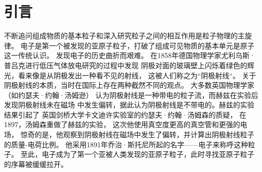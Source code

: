 ﻿\chapter{引言}%
\label{cha:intro}
不断追问组成物质的基本粒子和深入研究粒子之间的相互作用是粒子物理的主旋律。
电子是第一个被发现的亚原子粒子，打破了组成可见物质的基本单元是原子这一传统认识。
发现电子的历史曲折而艰难。
在1858年德国物理学家尤利乌斯·普吕克进行低压气体放电研究的过程中发现
阴极对面的玻璃壁上闪烁着绿色的辉光，看来像是从阴极发出一种看不见的射线，
这被人们称之为``阴极射线``\cite{Segr1981From}。
关于阴极射线的本质，当时在国际上存在两种截然不同的观点。
大多数英国物理学家（如约瑟夫·约翰·汤姆逊）
认为阴极射线是一种带电的粒子流，而赫兹在实验后发现阴极射线未在磁场
中发生偏转，据此认为阴极射线是不带电的。赫兹的实验结果引起了
英国剑桥大学卡文迪许实验室的约瑟夫·约翰·汤姆森的质疑，
在1897，汤姆森重做了赫兹的实验， 这次他使用真空度更高的真空管和更强的电场，
惊奇的是，他观察到阴极射线在磁场中发生了偏转，并计算出阴极射线粒子的质量-电荷比例。
他采用1891年乔治·斯托尼所起的名字——电子来称呼这种粒子。
至此，电子成为了第一个亚被人类发现的亚原子粒子，此时寻找亚原子粒子的序幕被缓缓拉开。

